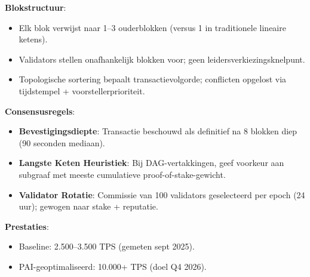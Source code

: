\documentclass[11pt]{article}
\begin{document}
\textbf{Blokstructuur}:
\begin{itemize}[noitemsep]
  \item Elk blok verwijst naar 1--3 ouderblokken (versus 1 in traditionele lineaire ketens).
  \item Validators stellen onafhankelijk blokken voor; geen leidersverkiezingsknelpunt.
  \item Topologische sortering bepaalt transactievolgorde; conflicten opgelost via tijdstempel + voorstellerprioriteit.
\end{itemize}

\textbf{Consensusregels}:
\begin{itemize}[noitemsep]
  \item \textbf{Bevestigingsdiepte}: Transactie beschouwd als definitief na 8 blokken diep (90 seconden mediaan).
  \item \textbf{Langste Keten Heuristiek}: Bij DAG-vertakkingen, geef voorkeur aan subgraaf met meeste cumulatieve proof-of-stake-gewicht.
  \item \textbf{Validator Rotatie}: Commissie van 100 validators geselecteerd per epoch (24 uur); gewogen naar stake + reputatie.
\end{itemize}

\textbf{Prestaties}:
\begin{itemize}[noitemsep]
  \item Baseline: 2.500--3.500 TPS (gemeten sept 2025).
  \item PAI-geoptimaliseerd: 10.000+ TPS (doel Q4 2026).
\end{itemize}
\end{document}
